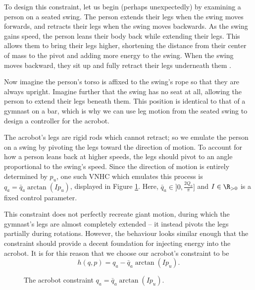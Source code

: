 To design this constraint, let us begin (perhaps unexpectedly) by examining a person on
a seated swing.
The person extends their legs when the swing moves forwards, and retracts their
legs when the swing moves backwards.
As the swing gains speed, the person leans their body back while
extending their legs.
This allows them to bring their legs higher, shortening the distance
from their center of mass to the pivot and adding more energy to the swing.
When the swing moves backward, they sit up and fully retract their legs
underneath them \cite{how_to_pump_a_swing}.

Now imagine the person's torso is affixed to the swing's rope so that they are
always upright. 
Imagine further that the swing has no seat at all, allowing the person to extend
their legs beneath them. 
This position is identical to that of a gymnast on a bar, which is why we can
use leg motion from the seated swing to design a controller for the acrobot.

The acrobot's legs are rigid rods which cannot retract; so we emulate the person
on a swing by pivoting the legs toward the direction of motion. 
To account for how a person leans back at higher speeds, the legs should pivot to an
angle proportional to the swing's speed.
Since the direction of motion is entirely determined by \(p_u\), 
one such VNHC which emulates this process is \(q_a = \bar{q}_a\arctan( I p_u)\),
displayed in Figure \ref{fig:qa-arctan}.
Here, \(\bar{q}_a \in ]0,\frac{2 Q_a}{\pi}]\) and \(I \in \R_{>0}\) is a fixed
control parameter.

This constraint does not perfectly recreate giant motion, during which
the gymnast's legs are almost completely extended -- it instead pivots the legs
partially during rotations.
However, the behaviour looks similar enough that the constraint should provide a
decent foundation for injecting energy into the acrobot.
It is for this reason that we choose our acrobot's constraint to be
\begin{equation}\label{eqn:acrobot-constraint}
    h(q,p) = q_a - \bar{q}_a \arctan(I p_u)
    .
\end{equation}

\begin{figure}
    \centering
    
    \caption{The acrobot constraint \(q_a = \bar{q}_a \arctan(I p_u)\).}
    \label{fig:qa-arctan}
\end{figure}

